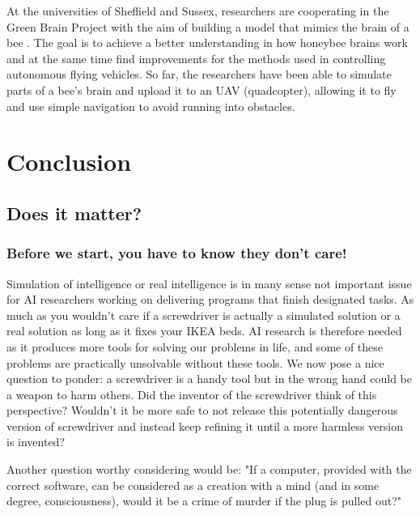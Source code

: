 \documentclass[11pt]{article}
\newenvironment{sketch}{\color{dark-green-2}}{\ignorespacesafterend}
\begin{document}
At the universities of Sheffield and Sussex, researchers are cooperating in the Green Brain Project with the aim of building a model that mimics the brain of a bee \cite{greenbrain2015}. The goal is to achieve a better understanding in how honeybee brains work and at the same time find improvements for the methods used in controlling autonomous flying vehicles. So far, the researchers have been able to simulate parts of a bee's brain and upload it to an UAV (quadcopter), allowing it to fly and use simple navigation to avoid running into obstacles.

\section{Conclusion}
\label{sec:conclusion}

\subsection{Does it matter?}

\subsubsection*{Before we start, you have to know they don't care!}
Simulation of intelligence or real intelligence is in many sense not important issue for AI researchers working on delivering programs that finish designated tasks. As much as you wouldn't care if a screwdriver is actually a simulated solution or a real solution as long as it fixes your IKEA beds. AI research is therefore needed as it produces more tools for solving our problems in life, and some of these problems are practically unsolvable without these tools. We now pose a nice question to ponder: a screwdriver is a handy tool but in the wrong hand could be a weapon to harm others. Did the inventor of the screwdriver think of this perspective? Wouldn't it be more safe to not release this potentially dangerous version of screwdriver and instead keep refining it until a more harmless version is invented?
  
Another question worthy considering would be: "If a computer, provided with the correct software, can be considered as a creation with a mind (and in some degree, consciousness), would it be a crime of murder if the plug is pulled out?"

%
\end{document}
